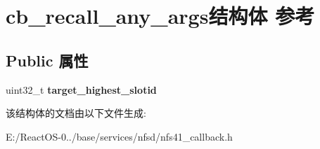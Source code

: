 \hypertarget{structcb__recall__any__args}{}\section{cb\+\_\+recall\+\_\+any\+\_\+args结构体 参考}
\label{structcb__recall__any__args}
\subsection*{Public 属性}
\begin{DoxyCompactItemize}
\item 
\mbox{\label{structcb__recall__any__args_ae31ead27d96a3198eb17092fd676a195}} 
uint32\+\_\+t {\bfseries target\+\_\+highest\+\_\+slotid}
\end{DoxyCompactItemize}


该结构体的文档由以下文件生成\+:\begin{DoxyCompactItemize}
\item 
E\+:/\+React\+O\+S-\/0../base/services/nfsd/nfs41\+\_\+callback.\+h\end{DoxyCompactItemize}

